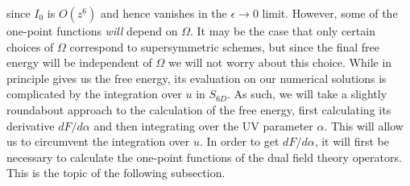 \documentclass[12pt]{article}
\begin{document}
since $I_0$ is $O(z^6)$ and hence vanishes in the $\epsilon \rightarrow 0$ limit. However, some of the one-point functions \textit{will} depend on $\Omega$. It may be the case that only certain choices of $\Omega$ correspond to supersymmetric schemes, but since the final free energy will be independent of $\Omega$ we will not worry about this choice.
While in principle  gives us the free energy, its evaluation on our numerical solutions is complicated by the integration over $u$ in $S_{6D}$. As such, we will take a slightly roundabout approach to the calculation of the free energy, first calculating its derivative $dF/d\alpha$ and then integrating over the UV parameter $\alpha$. This will allow us to circumvent the integration over $u$. In order to get $dF/d\alpha$, it will first be necessary to calculate the one-point functions of the dual field theory operators. This is the topic of the following subsection. 
\end{document}
